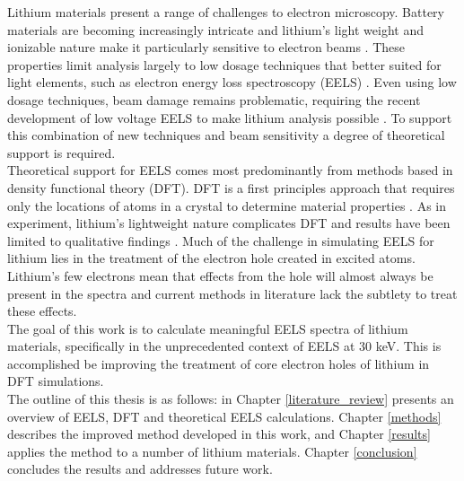 Lithium materials present a range of challenges to electron microscopy.  Battery materials are becoming increasingly intricate and lithium's light weight and ionizable nature make it particularly sensitive to electron beams \cite{kobayashi_quantitative_2017}.  These properties limit analysis largely to low dosage techniques that better suited for light elements, such as electron energy loss spectroscopy (EELS) \cite{Egerton}.  Even using low dosage techniques, beam damage remains problematic, requiring the recent development of low voltage EELS to make lithium analysis possible \cite{SU_9000}.  To support this combination of new techniques and beam sensitivity a degree of theoretical support is required.  
\\

Theoretical support for EELS  comes most predominantly from methods based in density functional theory (DFT).  DFT is a first principles approach that requires only the locations of atoms in a crystal to determine material properties \cite{ks_1965, wien2k,elk,exciting, vasp}.  As in experiment, lithium's lightweight nature complicates DFT and results have been limited to qualitative findings \cite{mauchamp_ab_2006, mauchamp_local_2008}. Much of the challenge in simulating EELS for lithium lies in the treatment of the electron hole created in excited atoms.  Lithium's few electrons mean that effects from the hole will almost always be present in the spectra and current methods in literature lack the subtlety to treat these effects. \\

The goal of this work is to calculate meaningful EELS spectra of lithium materials, specifically in the unprecedented context of EELS at 30 keV. This is accomplished be improving the treatment of core electron holes of lithium in DFT simulations. \\

The outline of this thesis is as follows: in Chapter \ref{literature_review} presents an overview of EELS, DFT and theoretical EELS calculations.  Chapter \ref{methods} describes the improved method developed in this work, and Chapter \ref{results} applies the method to a number of lithium materials.  Chapter \ref{conclusion} concludes the results and addresses future work.


